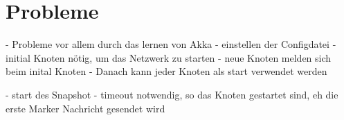 \section{Probleme}
\label{sec:probs}

- Probleme vor allem durch das lernen von Akka
  - einstellen der Configdatei
  - initial Knoten nötig, um das Netzwerk zu starten
  - neue Knoten melden sich beim inital Knoten
  - Danach kann jeder Knoten als start verwendet werden
  
- start des Snapshot
  - timeout notwendig, so das Knoten gestartet sind, eh die erste Marker 
    Nachricht gesendet wird